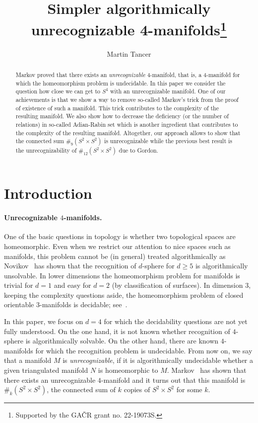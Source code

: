 \documentclass[10pt,a4paper]{article}
\title{Simpler algorithmically unrecognizable 4-manifolds\thanks{Supported by the GA\v{C}R
grant no. 22-19073S.}}
\author[1]{Martin Tancer}
\affil[1]{\small Department of Applied Mathematics, Charles University, Malostransk\'{e} n\'{a}m.
25, 118~00~~Praha~1, Czech Republic}
\date{}
\theoremstyle{definition}
\theoremstyle{remark}
\begin{document}
\maketitle
\begin{abstract}
  Markov proved that there exists an \emph{unrecognizable} 4-manifold, that is,
  a 4-manifold for which the homeomorphism
  problem is undecidable. In this paper we consider the question how close 
  we can get to $S^4$ with an unrecognizable manifold. One of our achievements is
  that we show a way to remove so-called Markov's trick from the proof of
  existence of such a manifold. This trick contributes to the complexity of the
  resulting manifold. We also show how to decrease the deficiency (or the
  number of relations) in so-called Adian-Rabin set which is another ingredient that
  contributes to the complexity of the resulting manifold. Altogether, our
  approach allows to show that the connected sum $\#_9(S^2 \times S^2)$ is
  unrecognizable while the previous best result is the unrecognizability of
  $\#_{12}(S^2 \times S^2)$ due to Gordon.
\end{abstract}



\section{Introduction}

\paragraph{Unrecognizable $4$-manifolds.}
One of the basic questions in topology is whether two topological spaces are
homeomorphic. Even when we restrict our attention to nice spaces such as
manifolds, this problem cannot be (in general) treated algorithmically as
Novikov~\cite{volodin-kuznetsov-fomenko74} has shown that the recognition of
$d$-sphere for $d \geq 5$ is algorithmically unsolvable. In lower
dimensions the homeomorphism problem for manifolds is trivial for $d = 1$ and
easy for $d=2$ (by classification of surfaces). In dimension $3$, keeping the
complexity questions aside, the homeomorphism problem of closed orientable
$3$-manifolds is decidable; see~\cite{kuperberg19}.

In this paper, we focus on $d=4$ for which the decidability questions are not
yet fully understood. On the one hand, it is not known whether recognition of
$4$-sphere is algorithmically solvable. On the other hand, there are known
$4$-manifolds for which the recognition problem is undecidable. From now on, we
say that a manifold $M$ is \emph{unrecognizable}, if it is algorithmically
undecidable whether a given triangulated manifold $N$ is homeomorphic to $M$.
Markov~\cite{markov60} has shown that there exists an unrecognizable
$4$-manifold and it turns out that this manifold is $\#_k(S^2 \times S^2)$, the
connected sum of $k$ copies of $S^2 \times S^2$ for some $k$. 
\end{document}

